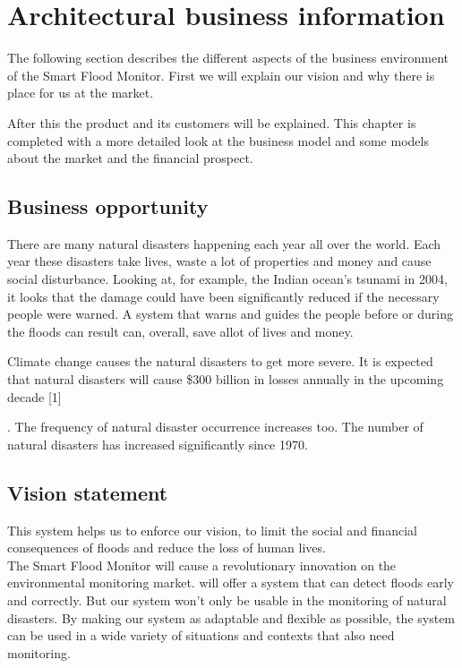 
\clearpage
\chapter{Architectural business information}
\label{ch:business}
The following section describes the different aspects of the business environment of the Smart Flood Monitor. First we will explain our vision and why there is place for us at the market.
 
After this the product and its customers will be explained. This chapter is completed with a more detailed look at the business model and some models about the market and the financial prospect.


\section{Business opportunity}
There are many natural disasters happening each year all over the world. Each year these disasters take lives, waste a lot of properties and money and cause social disturbance.
Looking at, for example, the Indian ocean's tsunami in 2004, it looks that the damage could have been significantly reduced if the necessary people were warned. 
A system that warns and guides the people before or during the floods can result can, overall, save allot of lives and money.

Climate change causes the natural disasters to get more severe. It is expected that natural disasters will cause \$300 billion in losses annually in the upcoming decade [1]. The frequency of natural disaster occurrence increases too. The number of natural disasters has increased significantly since 1970. 

\section{Vision statement}
This system helps us to enforce our vision, to limit the social and financial consequences of floods and reduce the loss of human lives. \\
The Smart Flood Monitor will cause a revolutionary innovation on the environmental monitoring market. \CompanyName{} will offer a system that can detect floods early and correctly. But our system won't only be usable in the monitoring of natural disasters. By making our system as adaptable and flexible as possible, the system can be used in a wide variety of situations and contexts that also need monitoring.

